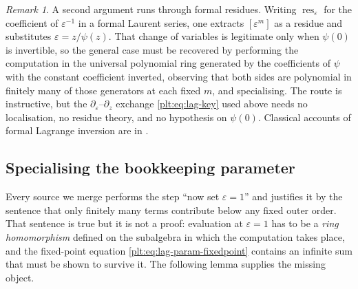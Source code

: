 \documentclass[11pt,oneside]{article}
\theoremstyle{plain}
\theoremstyle{definition}
\theoremstyle{remark}
\newtheorem{remark}[theorem]{Remark}
\begin{document}
\begin{remark}
\label{plt:rmk:lag-residue-route}
A second argument runs through formal residues.  Writing
\(\operatorname*{res}_\varepsilon\) for the coefficient of
\(\varepsilon^{-1}\) in a formal Laurent series, one extracts
\([\varepsilon^m]\) as a residue and substitutes
\(\varepsilon=z/\psi(z)\).  That change of variables is legitimate only when
\(\psi(0)\) is invertible, so the general case must be recovered by performing
the computation in the universal polynomial ring generated by the coefficients
of \(\psi\) with the constant coefficient inverted, observing that both sides
are polynomial in finitely many of those generators at each fixed \(m\), and
specialising.  The route is instructive, but the
\(\partial_\varepsilon\)--\(\partial_z\) exchange \cref{plt:eq:lag-key} used
above needs no localisation, no residue theory, and no hypothesis on
\(\psi(0)\).  Classical accounts of formal Lagrange inversion are in
\cite{comtet-book,graham-knuth-patashnik}.
\end{remark}

\subsection{Specialising the bookkeeping parameter}
\label{plt:sec:lag-specialisation}

Every source we merge performs the step ``now set \(\varepsilon=1\)'' and
justifies it by the sentence that only finitely many terms contribute below any
fixed outer order.  That sentence is true but it is not a proof: evaluation at
\(\varepsilon=1\) has to be a \emph{ring homomorphism} defined on the subalgebra
in which the computation takes place, and the fixed-point equation
\cref{plt:eq:lag-param-fixedpoint} contains an infinite sum that must be shown
to survive it.  The following lemma supplies the missing object.
\end{document}
